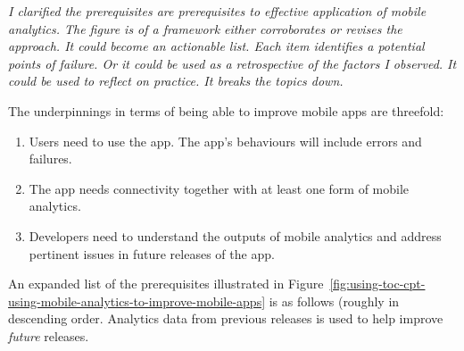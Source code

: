 \textit{I clarified the prerequisites are prerequisites to effective application of mobile analytics. The figure is of a framework either corroborates or revises the approach. It could become an actionable list. Each item identifies a potential points of failure. Or it could be used as a retrospective of the factors I observed. It could be used to reflect on practice. It breaks the topics down.}


%
The underpinnings in terms of being able to improve mobile apps are threefold: 
\begin{enumerate}
    \item Users need to use the app. The app's behaviours will include errors and failures.
    \item The app needs connectivity together with at least one form of mobile analytics.
    \item Developers need to understand the outputs of mobile analytics and address pertinent issues in future releases of the app.
\end{enumerate}

An expanded list of the prerequisites illustrated in Figure~\ref{fig:using-toc-cpt-using-mobile-analytics-to-improve-mobile-apps} is as follows (roughly in descending order. Analytics data from previous releases is used to help improve \emph{future} releases.

